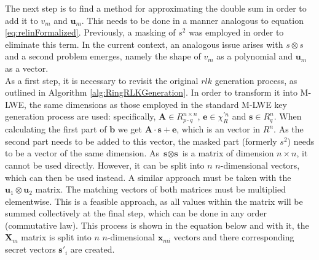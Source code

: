 The next step is to find a method for approximating the double sum in order to add it to $v_m$ and $\textbf{u}_m$. This needs to be done in a manner analogous to equation \ref{eq:relinFormalized}. Previously, a masking of $s^2$ was employed in order to eliminate this term. In the current context, an analogous issue arises with $s \otimes s$ and a second problem emerges, namely the shape of $v_m$ as a polynomial and $\textbf{u}_m$ as a vector. \\
As a first step, it is necessary to revisit the original $rlk$ generation process, as outlined in Algorithm \ref{alg:RingRLKGeneration}. In order to transform it into M-LWE, the same dimensions as those employed in the standard M-LWE key generation process are used: specifically, $\textbf{A} \in R^{n \times n}_{p \cdot q}$, $\textbf{e} \in \chi^{'n}_{R}$ and $\textbf{s} \in R^n_q$. When calculating the first part of $\textbf{b}$ we get $\textbf{A}\cdot \textbf{s} + \textbf{e}$, which is an vector in $R^n$. As the second part needs to be added to this vector, the masked part (formerly $s^2$) needs to be a vector of the same dimension. As $\textbf{s} \otimes \textbf{s}$ is a matrix of dimension $n \times n$, it cannot be used directly. However, it can be split into $n$ $n$-dimensional vectors, which can then be used instead. A similar approach must be taken with the $\textbf{u}_1 \otimes \textbf{u}_2$ matrix. The matching vectors of both matrices must be multiplied elementwise. This is a feasible approach, as all values within the matrix will be summed collectively at the final step, which can be done in any order (commutative law). This process is shown in the equation below and with it, the $\textbf{X}_m$ matrix is split into $n$ $n$-dimensional $\textbf{x}_{mi}$ vectors and there corresponding secret vectors $\textbf{s}'_i$ are created.

